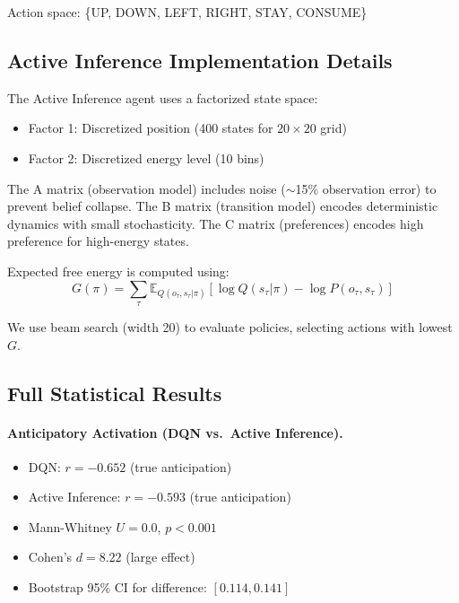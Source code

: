\documentclass{article}
\begin{document}
Action space: \{UP, DOWN, LEFT, RIGHT, STAY, CONSUME\}

\subsection{Active Inference Implementation Details}

The Active Inference agent uses a factorized state space:
\begin{itemize}
    \item Factor 1: Discretized position (400 states for $20 \times 20$ grid)
    \item Factor 2: Discretized energy level (10 bins)
\end{itemize}

The A matrix (observation model) includes noise ($\sim$15\% observation error) to prevent belief collapse. The B matrix (transition model) encodes deterministic dynamics with small stochasticity. The C matrix (preferences) encodes high preference for high-energy states.

Expected free energy is computed using:
\begin{equation}
    G(\pi) = \sum_\tau \mathbb{E}_{Q(o_\tau, s_\tau | \pi)} \left[ \log Q(s_\tau | \pi) - \log P(o_\tau, s_\tau) \right]
\end{equation}

We use beam search (width 20) to evaluate policies, selecting actions with lowest $G$.

\subsection{Full Statistical Results}

\paragraph{Anticipatory Activation (DQN vs.\ Active Inference).}
\begin{itemize}
    \item DQN: $r = -0.652$ (true anticipation)
    \item Active Inference: $r = -0.593$ (true anticipation)
    \item Mann-Whitney $U = 0.0$, $p < 0.001$
    \item Cohen's $d = 8.22$ (large effect)
    \item Bootstrap 95\% CI for difference: $[0.114, 0.141]$
\end{itemize}
\end{document}

